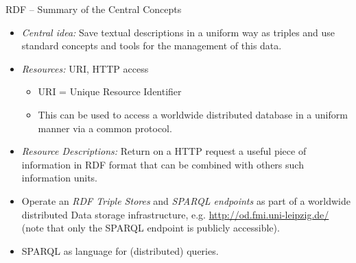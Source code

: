 \documentclass{beamer}
\begin{document}
\begin{frame}{RDF -- Summary of the Central Concepts}
\begin{itemize}
\item \emph{Central idea:} Save textual descriptions in a uniform way as
  triples and use standard concepts and tools for the management of this data.
\item \emph{Resources:} URI, HTTP access
  \begin{itemize}
  \item URI = Unique Resource Identifier
  \item This can be used to access a worldwide distributed database in a
    uniform manner via a common protocol.
  \end{itemize}
\item \emph{Resource Descriptions:} Return on a HTTP request a useful piece of
  information in RDF format that can be combined with others such information
  units.
\item Operate an \emph{RDF Triple Stores} and \emph{SPARQL endpoints} as part
  of a worldwide distributed Data storage infrastructure,
  e.g. \url{http://od.fmi.uni-leipzig.de/} (note that only the SPARQL endpoint
  is publicly accessible).
\item SPARQL as language for (distributed) queries.
\end{itemize}
\end{frame}
\end{document}
